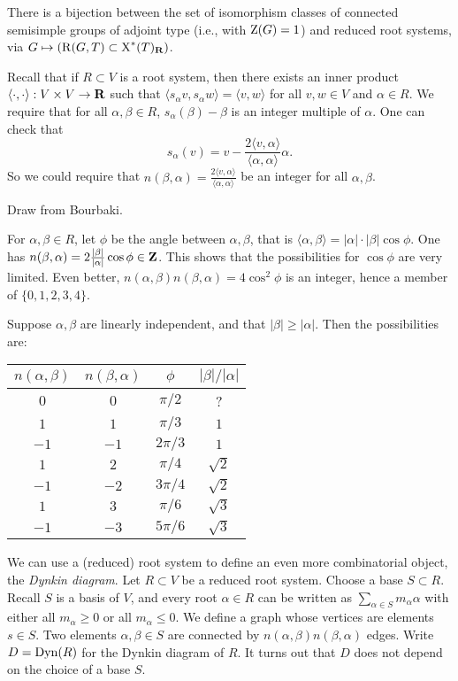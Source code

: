 There is a bijection between the set of isomorphism classes of connected 
semisimple groups of adjoint type (i.e., with $\operatorname{Z}(G)=1$) and 
reduced root systems, via 
$G\mapsto (\operatorname{R}(G,T)\subset \operatorname{X}^\ast(T)_{\mathbf{R}})$. 

Recall that if $R\subset V$ is a root system, then there exists an inner 
product $\langle \cdot,\cdot\rangle:V\times V\to \mathbf{R}$ such that 
$\langle s_\alpha v,s_\alpha w\rangle=\langle v,w\rangle$ for all 
$v,w\in V$ and $\alpha\in R$. We require that for all 
$\alpha,\beta\in R$, $s_\alpha(\beta)-\beta$ is an integer multiple of 
$\alpha$. One can check that 
\[
  s_\alpha(v)=v - \frac{2\langle v,\alpha\rangle}{\langle\alpha,\alpha\rangle}\alpha .
\]
So we could require that 
$n(\beta,\alpha)=\frac{2\langle v,\alpha\rangle}{\langle\alpha,\alpha\rangle}$ 
be an integer for all $\alpha,\beta$. 

\begin{example}
Draw from Bourbaki. 
\end{example}

For $\alpha,\beta\in R$, let $\phi$ be the angle between $\alpha,\beta$, 
that is $\langle \alpha,\beta\rangle = |\alpha|\cdot |\beta| \cos\phi$. 
One has $n(\beta,\alpha)=2\frac{|\beta|}{|\alpha|}\cos\phi\in \mathbf{Z}$. This shows 
that the possibilities for $\cos\phi$ are very limited. Even better, 
$n(\alpha,\beta)n(\beta,\alpha)=4\cos^2\phi$ is an integer, hence a member of 
$\{0,1,2,3,4\}$. 

Suppose $\alpha,\beta$ are linearly independent, and that 
$|\beta|\geqslant |\alpha|$. Then the possibilities are: 
\begin{center}
\begin{tabular}{c|c|c|c}
  $n(\alpha,\beta)$ & $n(\beta,\alpha)$ & $\phi$ & $|\beta|/|\alpha|$ \\ \hline 
  $0$  & $0$  & $\pi/2$  & ? \\
  $1$  & $1$  & $\pi/3$  & $1$ \\
  $-1$ & $-1$ & $2\pi/3$ & $1$ \\
  $1$  & $2$  & $\pi/4$  & $\sqrt 2$ \\
  $-1$ & $-2$ & $3\pi/4$ & $\sqrt 2$ \\
  $1$  & $3$  & $\pi/6$  & $\sqrt 3$ \\
  $-1$ & $-3$ & $5\pi/6$ & $\sqrt 3$
\end{tabular}
\end{center}

We can use a (reduced) root system to define an even more combinatorial 
object, the \emph{Dynkin diagram}. Let $R\subset V$ be a reduced root system. 
Choose a base $S\subset R$. Recall $S$ is a basis of $V$, and every root 
$\alpha\in R$ can be written as $\sum_{\alpha\in S} m_\alpha \alpha$ with 
either all $m_\alpha\geqslant 0$ or all $m_\alpha\leqslant 0$. 
We define a graph whose vertices are elements $s\in S$. Two elements 
$\alpha,\beta\in S$ are connected by $n(\alpha,\beta)n(\beta,\alpha)$ edges. 
Write $D=\operatorname{Dyn}(R)$ for the Dynkin diagram of $R$. It turns out that $D$ does 
not depend on the choice of a base $S$. 

